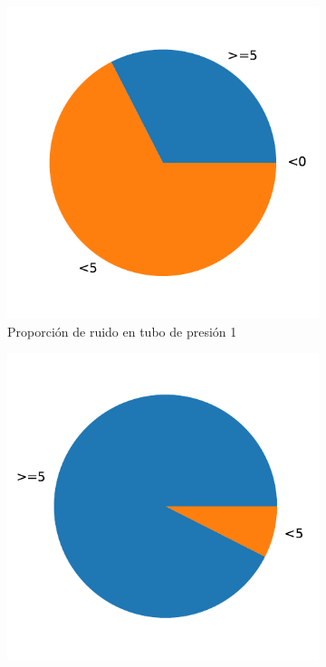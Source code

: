 \documentclass[a4paper,12pt,twoside,oldfontcommands]{memoir}
\begin{document}
\begin{figure}
	\centering
	\begin{subfigure}[b]{0.45\textwidth}
		\includegraphics[width=\textwidth]{images/ruido/p1-ruido}
		\caption{Proporción de ruido en tubo de presión 1}
		\label{fig:p1_ruido}
	\end{subfigure}
	\begin{subfigure}[b]{0.45\textwidth}
		\includegraphics[width=\textwidth]{images/ruido/p2-ruido}

\end{subfigure}
\end{figure}
\end{document}
